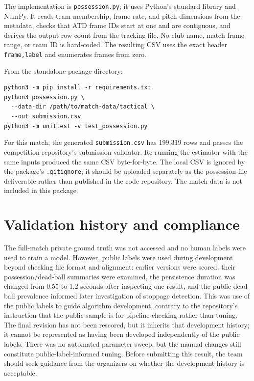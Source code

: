 \documentclass[11pt,a4paper]{article}
\begin{document}
The implementation is \texttt{possession.py}; it uses Python's standard library and NumPy. It reads
team membership, frame rate, and pitch dimensions from the metadata, checks that ATD frame IDs start
at one and are contiguous, and derives the output row count from the tracking file. No club name,
match frame range, or team ID is hard-coded. The resulting CSV uses the exact header
\texttt{frame,label} and enumerates frames from zero.

From the standalone package directory:
\begin{lstlisting}
python3 -m pip install -r requirements.txt
python3 possession.py \
  --data-dir /path/to/match-data/tactical \
  --out submission.csv
python3 -m unittest -v test_possession.py
\end{lstlisting}

For this match, the generated \texttt{submission.csv} has 199,319 rows and passes the competition
repository's submission validator. Re-running the estimator with the same inputs produced the
same CSV byte-for-byte. The local CSV is ignored by the package's \texttt{.gitignore}; it should be
uploaded separately as the possession-file deliverable rather than published in the code
repository. The match data is not included in this package.

\section{Validation history and compliance}

The full-match private ground truth was not accessed and no human labels were used to train a model.
However, public labels were used during development beyond checking file format and alignment:
earlier versions were scored, their possession/dead-ball summaries were examined, the persistence
duration was changed from 0.55 to 1.2 seconds after inspecting one result, and the public dead-ball
prevalence informed later investigation of stoppage detection. This was use of the public labels to
guide algorithm development, contrary to the repository's instruction that the public sample is
for pipeline checking rather than tuning. The final revision has not been rescored, but it inherits
that development history; it cannot be represented as having been developed independently of the
public labels. There was no automated parameter sweep, but the manual changes still constitute
public-label-informed tuning. Before submitting this result, the team should seek guidance from the
organizers on whether the development history is acceptable.
\end{document}
